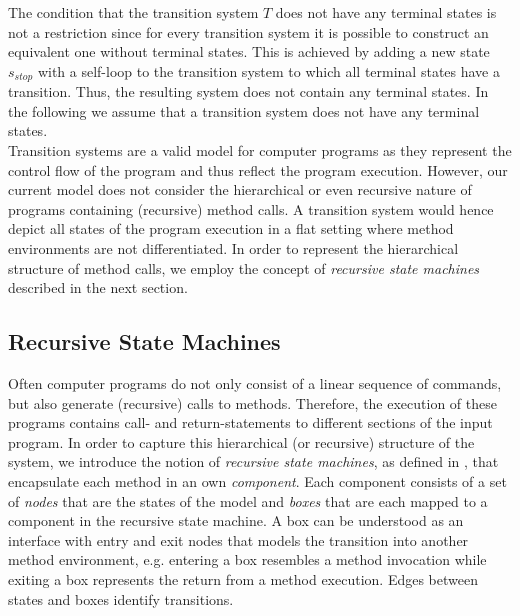 \documentclass[a4paper, 12pt, twoside]{report}
\begin{document}
	The condition that the transition system $T$ does not have any terminal states is not a restriction since for every transition system it is possible to construct an equivalent one without terminal states. This is achieved by adding a new state $s_{stop}$ with a self-loop to the transition system to which all terminal states have a transition. Thus, the resulting system does not contain any terminal states. In the following we assume that a transition system does not have any terminal states.\\
	
	Transition systems are a valid model for computer programs as they represent the control flow of the program and thus reflect the program execution. However, our current model does not consider the hierarchical or even recursive nature of programs containing (recursive) method calls. A transition system would hence depict all states of the program execution in a flat setting where method environments are not differentiated. In order to represent the hierarchical structure of method calls, we employ the concept of \textit{recursive state machines} described in the next section.
	

	\subsection{Recursive State Machines}
	
	Often computer programs do not only consist of a linear sequence of commands, but also generate (recursive) calls to methods. Therefore, the execution of these programs contains call- and return-statements to different sections of the input program. In order to capture this hierarchical (or recursive) structure of the system, we introduce the notion of \textit{recursive state machines}, as defined in \cite{alur2001analysis}, that encapsulate each method in an own \textit{component}. Each component consists of a set of \textit{nodes} that are the states of the model and \textit{boxes} that are each mapped to a component in the recursive state machine. A box can be understood as an interface with entry and exit nodes that models the transition into another method environment, e.g. entering a box resembles a method invocation while exiting a box represents the return from a method execution. Edges between states and boxes identify transitions. 
	
\end{document}
